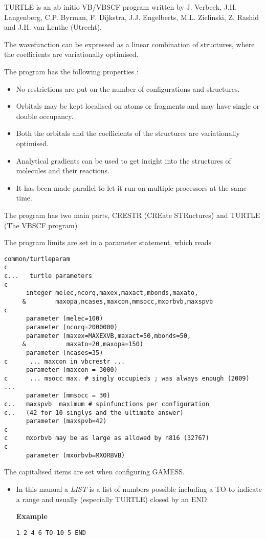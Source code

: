 \documentclass[11pt,fleqn]{article}
\begin{document}
TURTLE is an ab initio VB/VBSCF \cite{ref:vb1,ref:vb2} program written by
J. Verbeek, J.H. Langenberg, C.P. Byrman, F. Dijkstra,
J.J. Engelberts, M.L. Zielinski, Z. Rashid  and J.H. van Lenthe (Utrecht)\cite{ref:vb3,ref:vb4,ref:vb5}.

The wavefunction can be expressed as a linear combination of structures,
where the coefficients are variationally optimised. 

The program has the following properties :

\begin{itemize}
\item No restrictions are put on the number of configurations and structures.
\item Orbitals may be kept localised on atoms or fragments and may have single
or double occupancy.
\item Both the orbitals and the coefficients of the structures are variationally
optimised.
\item Analytical gradients can be used to get insight into the structures of molecules and their reactions.
\item It has been made parallel to let it run on multiple processors at the same time.
\end{itemize}

The program has two main parts, CRESTR (CREate STRuctures)
and TURTLE (The VBSCF program)

The program limits are set in a parameter statement, which reads
\begin{verbatim}
common/turtleparam
c
c...   turtle parameters
c
      integer melec,ncorq,maxex,maxact,mbonds,maxato,
     &        maxopa,ncases,maxcon,mmsocc,mxorbvb,maxspvb
c
      parameter (melec=100)
      parameter (ncorq=2000000)
      parameter (maxex=MAXEXVB,maxact=50,mbonds=50,
     &           maxato=20,maxopa=150)
      parameter (ncases=35)
c      ... maxcon in vbcrestr ...
      parameter (maxcon = 3000)
c      ... msocc max. # singly occupieds ; was always enough (2009) ...
      parameter (mmsocc = 30)
c..   maxspvb  maximum # spinfunctions per configuration 
c..   (42 for 10 singlys and the ultimate answer)
      parameter (maxspvb=42) 
c
c     mxorbvb may be as large as allowed by n816 (32767)
c
      parameter (mxorbvb=MXORBVB)
\end{verbatim}
The capitalised items are set when configuring GAMESS.

\begin{itemize}
\item
In this manual a \textit{LIST} is a list of numbers possible including a TO to indicate 
a range and usually (especially TURTLE) closed by an END.

{\bf Example }
\begin{verbatim}
1 2 4 6 TO 10 5 END
\end{verbatim}
\end{itemize}
\end{document}
